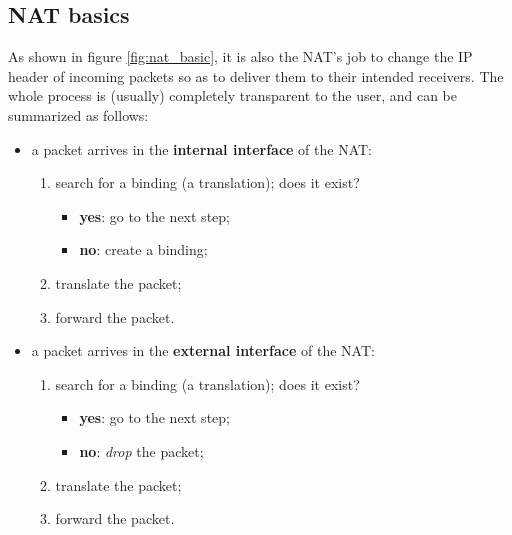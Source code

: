
\subsection{NAT basics}

As shown in figure \ref{fig:nat_basic}, it is also the NAT's job to change the IP header of incoming packets so as to deliver them to their intended receivers. The whole process is (usually) completely transparent to the user, and can be summarized as follows:

\begin{itemize}
    \item a packet arrives in the \textbf{internal interface} of the NAT:
        \begin{enumerate}
            \item search for a binding (a translation); does it exist?
                \begin{itemize}
                    \item \textbf{yes}: go to the next step;
                    \item \textbf{no}: create a binding;
                \end{itemize}
            \item translate the packet;
            \item forward the packet.
        \end{enumerate}
        
    \vspace{0.5em}
        
    \item a packet arrives in the \textbf{external interface} of the NAT:
        \begin{enumerate}
            \item search for a binding (a translation); does it exist?
                \begin{itemize}
                    \item \textbf{yes}: go to the next step;
                    \item \textbf{no}: \textit{drop} the packet;
                \end{itemize}
            \item translate the packet;
            \item forward the packet.
        \end{enumerate}
\end{itemize}

